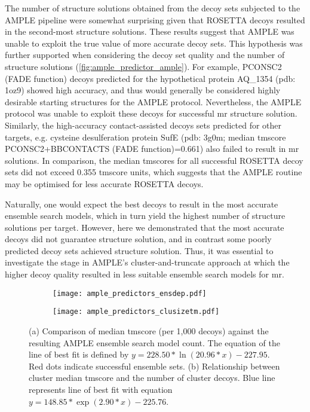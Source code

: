 The number of structure solutions obtained from the decoy sets subjected to the AMPLE pipeline were somewhat surprising given that ROSETTA decoys resulted in the second-most structure solutions. These results suggest that AMPLE was unable to exploit the true value of more accurate decoy sets. This hypothesis was further supported when considering the decoy set quality and the number of structure solutions (\cref{fig:ample_predictor_ample}). For example, PCONSC2 (FADE function) decoys predicted for the hypothetical protein AQ\_1354 (\gls{pdb}: 1oz9) showed high accuracy, and thus would generally be considered highly desirable starting structures for the AMPLE protocol. Nevertheless, the AMPLE protocol was unable to exploit these decoys for successful \gls{mr} structure solution. Similarly, the high-accuracy contact-assisted decoys sets predicted for other targets, e.g. cysteine desulferation protein SufE (\gls{pdb}: 3g0m; median \gls{tmscore} PCONSC2+BBCONTACTS (FADE function)=0.661) also failed to result in \gls{mr} solutions. In comparison, the median \gls{tmscore}s for all successful ROSETTA decoy sets did not exceed 0.355 \gls{tmscore} units, which suggests that the AMPLE routine may be optimised for less accurate ROSETTA decoys.

Naturally, one would expect the best decoys to result in the most accurate ensemble search models, which in turn yield the highest number of structure solutions per target. However, here we demonstrated that the most accurate decoys did not guarantee structure solution, and in contrast some poorly predicted decoy sets achieved structure solution. Thus, it was essential to investigate the stage in AMPLE's cluster-and-truncate approach at which the higher decoy quality resulted in less suitable ensemble search models for \gls{mr}.

\begin{figure}[H]
    \centering
    \begin{subfigure}[b]{0.49\textwidth}
        \centering
        \texttt{[image: ample\_predictors\_ensdep.pdf]}
        \caption{}
        \label{fig:ample_predictor_ensdep}
    \end{subfigure}
    \begin{subfigure}[b]{0.49\textwidth}
        \centering
        \texttt{[image: ample\_predictors\_clusizetm.pdf]}
        \caption{}
        \label{fig:ample_predictor_clusizetm}
    \end{subfigure}

    \caption[SPICKER cluster analysis in relation to TM-score and AMPLE ensembles]{(a) Comparison of median \gls{tmscore} (per 1,000 decoys) against the resulting AMPLE ensemble search model count. The equation of the line of best fit is defined by $y=228.50*\ln\left(20.96*x\right)-227.95$. Red dots indicate successful ensemble sets. (b) Relationship between cluster median \gls{tmscore} and the number of cluster decoys. Blue line represents line of best fit with equation $y=148.85*\exp\left(2.90*x\right)-225.76$.}
\end{figure}

